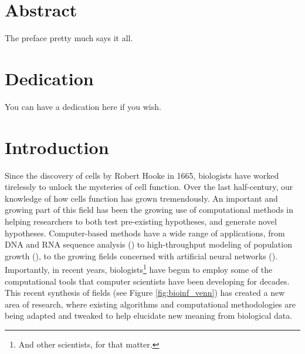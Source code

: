 \documentclass[12pt,twoside]{reedthesis}
\theoremstyle{definition}
\begin{document}
\vfill\vfill


    \tableofcontents
    \listoftables
    \listoffigures

    \chapter*{Abstract}
	The preface pretty much says it all.

	\chapter*{Dedication}
	You can have a dedication here if you wish.

  \mainmatter %
  \pagestyle{fancyplain} %


    \chapter*{Introduction}

\onehalfspacing

Since the discovery of cells by Robert Hooke in 1665, biologists have worked tirelessly to unlock the mysteries of cell function. Over the last half-century, our knowledge of how cells function has grown tremendously. An important and growing part of this field has been the growing use of computational methods in helping researchers to both test pre-existing hypotheses, and generate novel hypotheses. Computer-based methods have a wide range of applications, from DNA and RNA sequence analysis (\cite{humanGenome}) to high-throughput modeling of population growth (\cite{SomethingRelevant}), to the growing fields concerned with artificial neural networks (\cite{SomethingElse}). Importantly, in recent years, biologists\footnote{And other scientists, for that matter.} have begun to employ some of the computational tools that computer scientists have been developing for decades. This recent synthesis of fields (see Figure \ref{fig:bioinf_venn}) has created a new area of research, where existing algorithms and computational methodologies are being adapted and tweaked to help elucidate new meaning from biological data.\par
\end{document}

